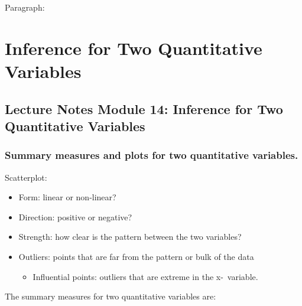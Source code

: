 \documentclass[
]{report}
\providecommand{\tightlist}{%
  \setlength{\itemsep}{0pt}\setlength{\parskip}{0pt}}
\begin{document}
\vspace{2.6in}

\newpage

Paragraph:

\newpage

\hypertarget{inference-for-two-quantitative-variables}{%
\chapter{Inference for Two Quantitative Variables}\label{inference-for-two-quantitative-variables}}

\hypertarget{lecture-notes-module-14-inference-for-two-quantitative-variables}{%
\section{Lecture Notes Module 14: Inference for Two Quantitative Variables}\label{lecture-notes-module-14-inference-for-two-quantitative-variables}}


\hypertarget{summary-measures-and-plots-for-two-quantitative-variables.}{%
\subsection*{Summary measures and plots for two quantitative variables.}\label{summary-measures-and-plots-for-two-quantitative-variables.}}

Scatterplot:

\begin{itemize}
\item
  Form: linear or non-linear?
\item
  Direction: positive or negative?
\item
  Strength: how clear is the pattern between the two variables?
\item
  Outliers: points that are far from the pattern or bulk of the data

  \begin{itemize}
  \tightlist
  \item
    Influential points: outliers that are extreme in the x-~variable.
  \end{itemize}
\end{itemize}


The summary measures for two quantitative variables are:
\end{document}
